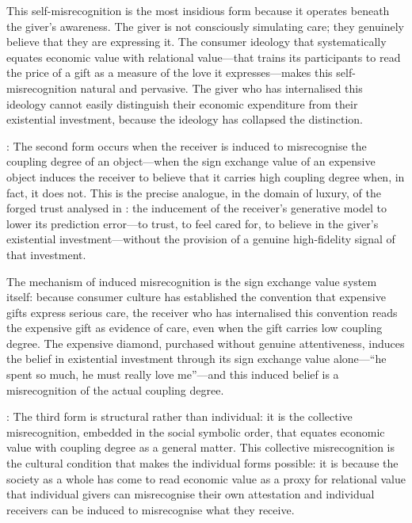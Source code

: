 This self-misrecognition is the most insidious form because it operates beneath the giver's awareness. The giver is not consciously simulating care; they genuinely believe that they are expressing it. The consumer ideology that systematically equates economic value with relational value---that trains its participants to read the price of a gift as a measure of the love it expresses---makes this self-misrecognition natural and pervasive. The giver who has internalised this ideology cannot easily distinguish their economic expenditure from their existential investment, because the ideology has collapsed the distinction.

: The second form occurs when the receiver is induced to misrecognise the coupling degree of an object---when the sign exchange value of an expensive object induces the receiver to believe that it carries high coupling degree when, in fact, it does not. This is the precise analogue, in the domain of luxury, of the forged trust analysed in  \parencite{paperxiii}: the inducement of the receiver's generative model to lower its prediction error---to trust, to feel cared for, to believe in the giver's existential investment---without the provision of a genuine high-fidelity signal of that investment.

The mechanism of induced misrecognition is the sign exchange value system itself: because consumer culture has established the convention that expensive gifts express serious care, the receiver who has internalised this convention reads the expensive gift as evidence of care, even when the gift carries low coupling degree. The expensive diamond, purchased without genuine attentiveness, induces the belief in existential investment through its sign exchange value alone---``he spent so much, he must really love me''---and this induced belief is a misrecognition of the actual coupling degree.

: The third form is structural rather than individual: it is the collective misrecognition, embedded in the social symbolic order, that equates economic value with coupling degree as a general matter. This collective misrecognition is the cultural condition that makes the individual forms possible: it is because the society as a whole has come to read economic value as a proxy for relational value that individual givers can misrecognise their own attestation and individual receivers can be induced to misrecognise what they receive.

